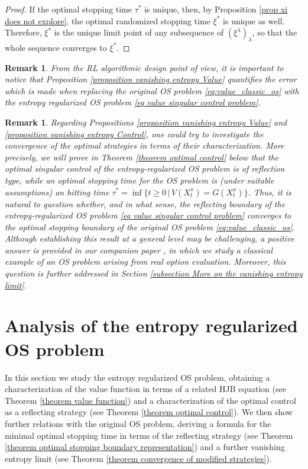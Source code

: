 \documentclass[11pt]{amsart}
\newtheorem{remark}[theorem]{Remark}
\theoremstyle{plain}
\numberwithin{equation}{section}
\begin{document}
\begin{proof}
If the optimal stopping time $\tau^*$ is unique, then, by Proposition \ref{prop xi does not explore}, the optimal randomized stopping time $\xi^*$ is unique as well.
Therefore, $\xi^*$ is the unique limit point of any subsequence of $(\xi^\lambda)_\lambda$, so that the whole sequence converges to $\xi^*$.
\end{proof}

\begin{remark}
From the RL algorithmic design point of view, it is important to notice that Proposition \ref{proposition vanishing entropy Value} quantifies the error which is made when replacing the original OS problem \eqref{eq:value_classic_os} with the entropy regularized OS problem \eqref{eq value singular control problem}.  
\end{remark}
\begin{remark}\label{remark vanishing entropy limits boundary}
Regarding Propositions \ref{proposition vanishing entropy Value} and \ref{proposition vanishing entropy Control}, one could try to investigate the convergence of the optimal strategies in terms of their characterization.
More precisely, we will prove in Theorem \ref{theorem optimal control} below that the optimal singular control of the entropy-regularized OS problem is of reflection type, 
while an optimal stopping time for the OS problem is (under suitable assumptions) an hitting time $\tau^* = \inf\{ t \geq 0 \, |\, V(X^x_t) = G(X^x_t) \}$.
Thus, it is natural to question whether, and in what sense, the reflecting boundary of the entropy-regularized OS problem \eqref{eq value singular control problem} converges to the optimal stopping boundary of the original OS problem  \eqref{eq:value_classic_os}.
Although establishing this result at a general level may be challenging, a positive answer is provided in our companion paper \cite{dianetti2026reinforcement}, in which we study a classical example of an OS problem arising from real option evaluation.
Moreover,  this question is further addressed in Section \ref{subsection More on the vanishing entropy limit}.
\end{remark}

\section{Analysis of the entropy regularized OS problem }\label{section DPP approach}
{In this section we study the entropy regularized OS problem, obtaining a characterization of the value function in terms of a related HJB equation (see Theorem \ref{theorem value function}) and a characterization of the optimal control as a reflecting strategy (see Theorem \ref{theorem optimal control}). 
We then show further relations with the original OS problem, deriving a formula for the minimal optimal stopping time in terms of the reflecting strategy (see Theorem \ref{theorem optimal stopping boundary representation}) and a further vanishing entropy limit (see Theorem \ref{theorem convergence of modified strategies}).
}
\end{document}

